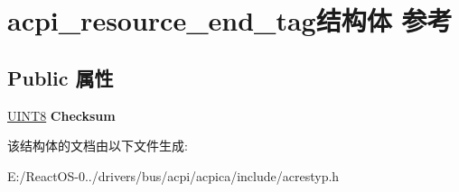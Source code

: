 \hypertarget{structacpi__resource__end__tag}{}\section{acpi\+\_\+resource\+\_\+end\+\_\+tag结构体 参考}
\label{structacpi__resource__end__tag}
\subsection*{Public 属性}
\begin{DoxyCompactItemize}
\item 
\mbox{\label{structacpi__resource__end__tag_ad4ff898527e86dd725db2f3455effd52}} 
\hyperlink{_processor_bind_8h_ab27e9918b538ce9d8ca692479b375b6a}{U\+I\+N\+T8} {\bfseries Checksum}
\end{DoxyCompactItemize}


该结构体的文档由以下文件生成\+:\begin{DoxyCompactItemize}
\item 
E\+:/\+React\+O\+S-\/0../drivers/bus/acpi/acpica/include/acrestyp.\+h\end{DoxyCompactItemize}
